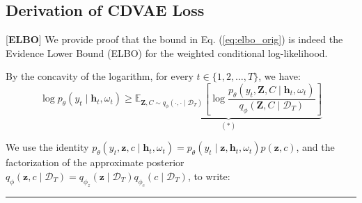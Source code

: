 \documentclass[10pt]{article} %
\newcommand{\BlackBox}{\rule{1.5ex}{1.5ex}}  %
\renewenvironment{proof}{\par\noindent{\bf Proof\ }}{\hfill\BlackBox\\[2mm]}
\newenvironment{proof}{\par\noindent{\bf Proof\ }}{\hfill\BlackBox\\[2mm]}
\begin{document}
\subsection{Derivation of CDVAE Loss}
\label{appendix:proof_elbo}
\begin{proof}[\textbf{ELBO}]
We provide proof that the bound in Eq. (\ref{eq:elbo_orig}) is indeed the Evidence Lower Bound (ELBO) for the weighted conditional log-likelihood.

By the concavity of the logarithm, for every \(t \in \{1, 2, \dots, T\}\), we have:
\begin{equation}
\label{eq:elbo_step}
\log p_\theta\left(y_{t} \mid \mathbf{h}_{t}, \omega_t\right) 
\geq 
\underbrace{\mathbb{E}_{\mathbf{Z}, C \sim q_{\phi}(\cdot , \cdot \mid \mathcal{D}_T)}  
\left[  
\log \frac{p_\theta\left(y_{t}, \mathbf{Z}, C\mid \mathbf{h}_{t}, \omega_{t}\right)}{q_{\phi}(\mathbf{Z}, C \mid \mathcal{D}_T)} 
\right]}_{(*)}
\end{equation}

We use the identity \(p_\theta(y_{t}, \mathbf{z}, c \mid \mathbf{h}_{t}, \omega_{t}) = p_\theta(y_{t} \mid \mathbf{z}, \mathbf{h}_{t}, \omega_{t})p(\mathbf{z},c)\), and the factorization of the approximate posterior \(q_{\phi}(\mathbf{z}, c \mid \mathcal{D}_T) = q_{\phi_z}(\mathbf{z} \mid \mathcal{D}_T) q_{\phi_c}(c \mid \mathcal{D}_T)\), to write:


\end{proof}
\end{document}
